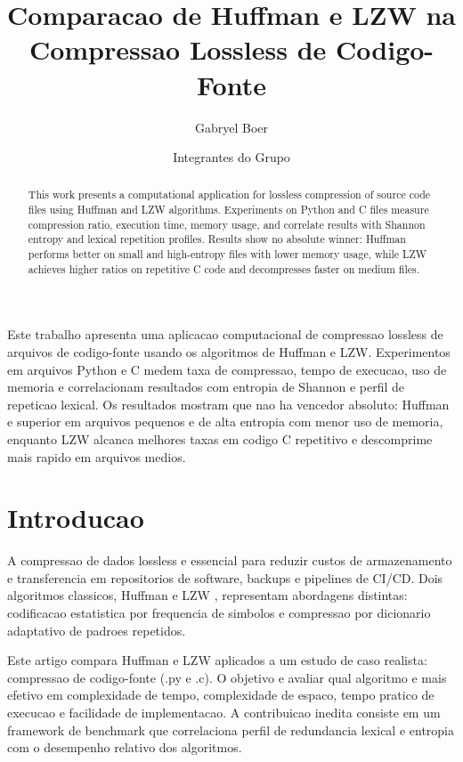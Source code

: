 \documentclass[12pt]{article}
\title{Comparacao de Huffman e LZW na Compressao Lossless de Codigo-Fonte}
\author{Gabryel Boer\inst{1} \and Integrantes do Grupo\inst{1}}
\begin{document}
\maketitle

\begin{abstract}
  This work presents a computational application for lossless compression of source code files using Huffman and LZW algorithms. Experiments on Python and C files measure compression ratio, execution time, memory usage, and correlate results with Shannon entropy and lexical repetition profiles. Results show no absolute winner: Huffman performs better on small and high-entropy files with lower memory usage, while LZW achieves higher ratios on repetitive C code and decompresses faster on medium files.
\end{abstract}

\begin{resumo}
  Este trabalho apresenta uma aplicacao computacional de compressao lossless de arquivos de codigo-fonte usando os algoritmos de Huffman e LZW. Experimentos em arquivos Python e C medem taxa de compressao, tempo de execucao, uso de memoria e correlacionam resultados com entropia de Shannon e perfil de repeticao lexical. Os resultados mostram que nao ha vencedor absoluto: Huffman e superior em arquivos pequenos e de alta entropia com menor uso de memoria, enquanto LZW alcanca melhores taxas em codigo C repetitivo e descomprime mais rapido em arquivos medios.
\end{resumo}

\section{Introducao}

A compressao de dados lossless e essencial para reduzir custos de armazenamento e transferencia em repositorios de software, backups e pipelines de CI/CD. Dois algoritmos classicos, Huffman \cite{huffman1952} e LZW \cite{welch1984,ziv1977}, representam abordagens distintas: codificacao estatistica por frequencia de simbolos e compressao por dicionario adaptativo de padroes repetidos.

Este artigo compara Huffman e LZW aplicados a um estudo de caso realista: compressao de codigo-fonte (.py e .c). O objetivo e avaliar qual algoritmo e mais efetivo em complexidade de tempo, complexidade de espaco, tempo pratico de execucao e facilidade de implementacao. A contribuicao inedita consiste em um framework de benchmark que correlaciona perfil de redundancia lexical e entropia com o desempenho relativo dos algoritmos.
\end{document}
